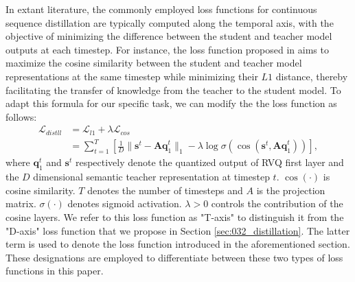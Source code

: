 In extant literature, the commonly employed loss functions for continuous sequence distillation are typically computed along the temporal axis, with the objective of minimizing the difference between the student and teacher model outputs at each timestep. For instance, the loss function proposed in \citep{chang2022distilhubert} aims to maximize the cosine similarity between the student and teacher model representations at the same timestep while minimizing their $L1$ distance, thereby facilitating the transfer of knowledge from the teacher to the student model. To adapt this formula for our specific task, we can modify the the loss function as follows: 
\begin{align*}
\mathcal{L}_{distll}&=\mathcal{L}_{l1}+\lambda\mathcal{L}_{cos}\\
&=\sum_{t=1}^T[\frac{1}{D}\lVert \mathbf{s}^t-\mathbf{Aq}_1^t\lVert_1 - \lambda\log\sigma(\cos{(\mathbf{s}^t, \mathbf{Aq}_1^t)})],
\end{align*}
where $\mathbf{q}_1^t$ and $\mathbf{s}^t$ respectively denote the quantized output of RVQ first layer and the $D$ dimensional semantic teacher representation at timestep $t$. $\cos(\cdot)$ is cosine similarity. $T$ denotes the number of timesteps and $A$ is the projection matrix. $\sigma(\cdot)$ denotes sigmoid activation. $\lambda>0$ controls the contribution of the cosine layers. We refer to this loss function as "T-axis" to distinguish it from the "D-axis" loss function that we propose in Section \ref{sec:032_distillation}. The latter term is used to denote the loss function introduced in the aforementioned section. These designations are employed to differentiate between these two types of loss functions in this paper.


